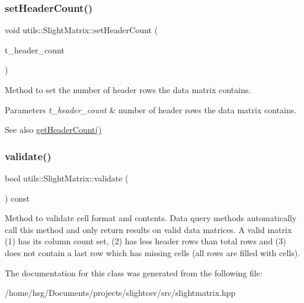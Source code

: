 \subsubsection{\texorpdfstring{set\+Header\+Count()}{setHeaderCount()}}
{\footnotesize\ttfamily void utils\+::\+Slight\+Matrix\+::set\+Header\+Count (\begin{DoxyParamCaption}\item[{size\+\_\+t}]{t\+\_\+header\+\_\+count }\end{DoxyParamCaption})}

Method to set the number of header rows the data matrix contains. 
\begin{DoxyParams}{Parameters}
{\em t\+\_\+header\+\_\+count} & number of header rows the data matrix contains. \\
\hline
\end{DoxyParams}
\begin{DoxySeeAlso}{See also}
\hyperlink{classutils_1_1SlightMatrix_ac3ba42c47509027bd1c4a07055f347b9}{get\+Header\+Count()} 
\end{DoxySeeAlso}
\mbox{\label{classutils_1_1SlightMatrix_a536e733a179ee3eaeb5c75986cc477d3}} 
\subsubsection{\texorpdfstring{validate()}{validate()}}
{\footnotesize\ttfamily bool utils\+::\+Slight\+Matrix\+::validate (\begin{DoxyParamCaption}\item[{void}]{ }\end{DoxyParamCaption}) const}

Method to validate cell format and contents. Data query methods automatically call this method and only return results on valid data matrices. A valid matrix (1) has its column count set, (2) has less header rows than total rows and (3) does not contain a last row which has missing cells (all rows are filled with cells). 

The documentation for this class was generated from the following file\+:\begin{DoxyCompactItemize}
\item 
/home/hsg/\+Documents/projects/slightcsv/src/slightmatrix.\+hpp\end{DoxyCompactItemize}
